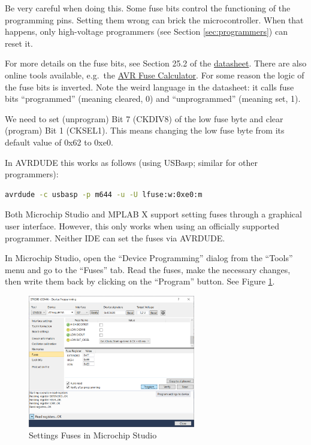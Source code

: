 \documentclass{article}
\newenvironment{caution}{\begin{tcolorbox}[colback=red!5!white,colframe=red!75!black,title=\textbf{Caution}]}{\end{tcolorbox}}
\newcommand{\datasheet}{\href{https://ww1.microchip.com/downloads/en/DeviceDoc/doc2593.pdf}{datasheet}}
\begin{document}
\begin{caution}
Be very careful when doing this. Some fuse bits control the functioning of the programming pins. Setting them wrong can brick the microcontroller. When that happens, only high-voltage programmers (see Section \ref{sec:programmers}) can reset it. 
\end{caution}

For more details on the fuse bits, see Section 25.2 of the \datasheet. There are also online tools available, e.g.\ the \href{https://eleccelerator.com/fusecalc/fusecalc.php?chip=atmega644}{AVR Fuse Calculator}. For some reason the logic of the fuse bits is inverted. Note the weird language in the datasheet: it calls fuse bits ``programmed'' (meaning cleared, 0) and ``unprogrammed'' (meaning set, 1). 

We need to set (unprogram) Bit 7 (CKDIV8) of the low fuse byte and clear (program) Bit 1 (CKSEL1). This means changing the low fuse byte from its default value of 0x62 to 0xe0. 

In AVRDUDE this works as follows (using USBasp; similar for other programmers):
\begin{lstlisting}[language=bash]
avrdude -c usbasp -p m644 -u -U lfuse:w:0xe0:m
\end{lstlisting}

Both Microchip Studio and MPLAB X support setting fuses through a graphical user interface. However, this only works when using an officially supported programmer. Neither IDE can set the fuses via AVRDUDE. 

In Microchip Studio, open the ``Device Programming'' dialog from the ``Tools'' menu and go to the ``Fuses'' tab. Read the fuses, make the necessary changes, then write them back by clicking on the ``Program'' button. See Figure \ref{fig:mchpStudioFuses}. 

\begin{figure}[htb]
\centering
\includegraphics[width=0.65\textwidth]{Pictures/MchpStudioFuses.png}
\caption{Settings Fuses in Microchip Studio}
\label{fig:mchpStudioFuses}
\end{figure}
\end{document}
